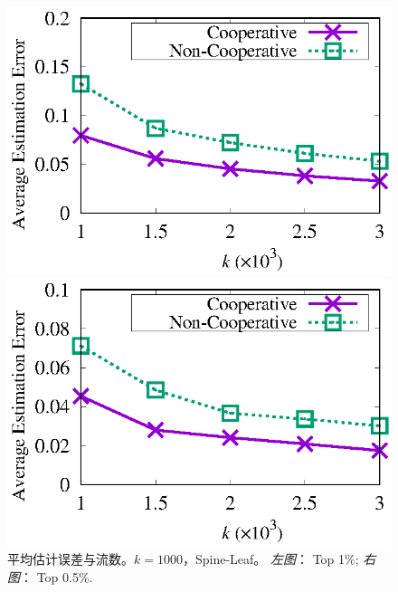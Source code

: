 \begin{figure}[!t]
	\centering
	\begin{minipage}[t]{0.49\linewidth}
		\centering
		\includegraphics[width=\linewidth]{fig/half_eg_099_k.eps}
	\end{minipage}\vspace{-0.6em}%
	\begin{minipage}[t]{0.49\linewidth}
		\centering
		\includegraphics[width=\linewidth]{fig/half_eg_095_k.eps}
	\end{minipage}\vspace{-0.6em}%
	\caption{\textnormal{平均估计误差与流数。$k=1000$，Spine-Leaf。 \textit{左图}： Top 1\%; \textit{右图}： Top 0.5\%.}}
	\label{fig:coop,acc,flow}
\end{figure}

